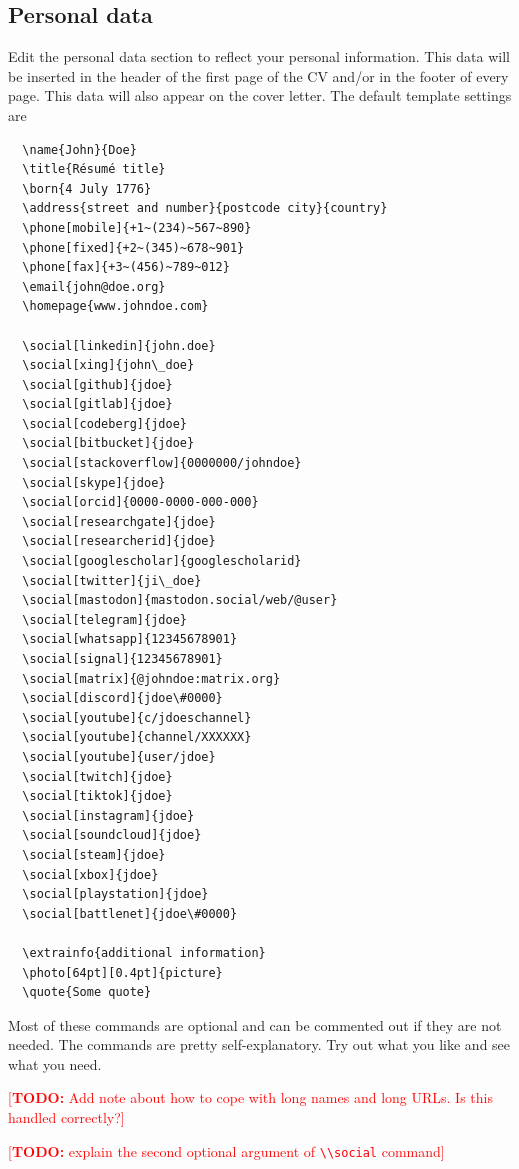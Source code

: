 \documentclass[a4paper, 11pt]{article}
\newcommand{\todo}[1]{\marginpar{\raggedright \textcolor{red}{[\textbf{TODO:} #1]}}}
\newcommand{\todox}[1]{\textcolor{red}{[\textbf{TODO:} #1]}}
\newcommand{\code}[1]{\lstinline!#1!}
\begin{document}
\subsection{Personal data}
Edit the personal data section to reflect your personal information.
This data will be inserted in the header of the first page of the CV and/or in the footer of every page.
This data will also appear on the cover letter.
The default template settings are
\begin{lstlisting}
  \name{John}{Doe}
  \title{Résumé title}
  \born{4 July 1776}
  \address{street and number}{postcode city}{country}
  \phone[mobile]{+1~(234)~567~890}
  \phone[fixed]{+2~(345)~678~901}
  \phone[fax]{+3~(456)~789~012}
  \email{john@doe.org}
  \homepage{www.johndoe.com}

  \social[linkedin]{john.doe}
  \social[xing]{john\_doe}
  \social[github]{jdoe}
  \social[gitlab]{jdoe}
  \social[codeberg]{jdoe}
  \social[bitbucket]{jdoe}
  \social[stackoverflow]{0000000/johndoe}
  \social[skype]{jdoe}
  \social[orcid]{0000-0000-000-000}
  \social[researchgate]{jdoe}
  \social[researcherid]{jdoe}
  \social[googlescholar]{googlescholarid}
  \social[twitter]{ji\_doe}
  \social[mastodon]{mastodon.social/web/@user}
  \social[telegram]{jdoe}
  \social[whatsapp]{12345678901}
  \social[signal]{12345678901}
  \social[matrix]{@johndoe:matrix.org}
  \social[discord]{jdoe\#0000}
  \social[youtube]{c/jdoeschannel}
  \social[youtube]{channel/XXXXXX}
  \social[youtube]{user/jdoe}
  \social[twitch]{jdoe}
  \social[tiktok]{jdoe}
  \social[instagram]{jdoe}
  \social[soundcloud]{jdoe}
  \social[steam]{jdoe}
  \social[xbox]{jdoe}
  \social[playstation]{jdoe}
  \social[battlenet]{jdoe\#0000}

  \extrainfo{additional information}
  \photo[64pt][0.4pt]{picture}
  \quote{Some quote}
\end{lstlisting}
\todo{explain adding pictures}
Most of these commands are optional and can be commented out if they are not needed.
The commands are pretty self-explanatory.
Try out what you like and see what you need.

\todox{Add note about how to cope with long names and long URLs. Is this handled correctly?}

\todox{explain the second optional argument of \code{\\social} command}
\end{document}
